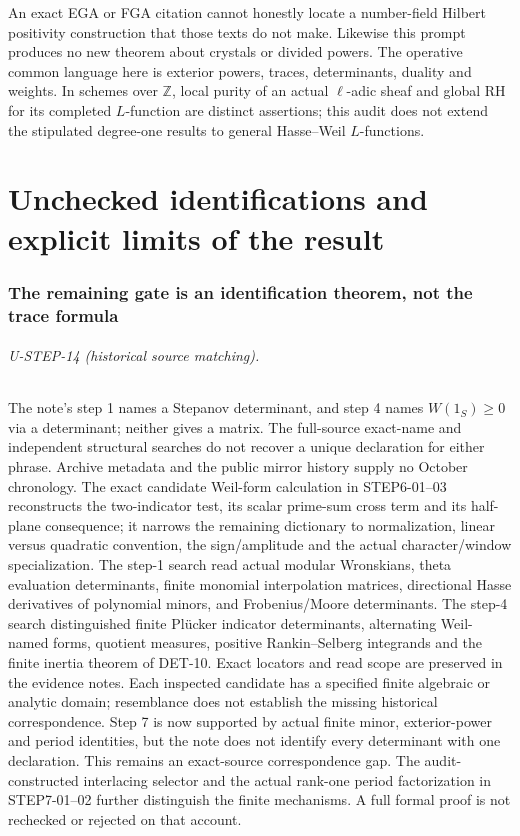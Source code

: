 \documentclass[11pt,a4paper]{article}
\newcommand{\Z}{\mathbb Z}
\newcommand{\fid}[1]{\textsf{#1}}
\begin{document}
An exact EGA or FGA citation cannot honestly locate a number-field Hilbert positivity construction that those texts do not make. Likewise this prompt produces no new theorem about crystals or divided powers. The operative common language here is exterior powers, traces, determinants, duality and weights. In schemes over $\Z$, local purity of an actual $\ell$-adic sheaf and global RH for its completed $L$-function are distinct assertions; this audit does not extend the stipulated degree-one results to general Hasse--Weil $L$-functions.

\part{Unchecked identifications and explicit limits of the result}
\section{The remaining gate is an identification theorem, not the trace formula}
\paragraph{U-STEP-14 (historical source matching).}
The note's step 1 names a Stepanov determinant, and step 4 names $W(1_S)\ge0$ via a determinant; neither gives a matrix. The full-source exact-name and independent structural searches do not recover a unique declaration for either phrase. Archive metadata and the public mirror history supply no October chronology. The exact candidate Weil-form calculation in \fid{STEP6-01--03} reconstructs the two-indicator test, its scalar prime-sum cross term and its half-plane consequence; it narrows the remaining dictionary to normalization, linear versus quadratic convention, the sign/amplitude and the actual character/window specialization. The step-1 search read actual modular Wronskians, theta evaluation determinants, finite monomial interpolation matrices, directional Hasse derivatives of polynomial minors, and Frobenius/Moore determinants. The step-4 search distinguished finite Pl\"ucker indicator determinants, alternating Weil-named forms, quotient measures, positive Rankin--Selberg integrands and the finite inertia theorem of \fid{DET-10}. Exact locators and read scope are preserved in the evidence notes. Each inspected candidate has a specified finite algebraic or analytic domain; resemblance does not establish the missing historical correspondence. Step 7 is now supported by actual finite minor, exterior-power and period identities, but the note does not identify every determinant with one declaration. This remains an exact-source correspondence gap. The audit-constructed interlacing selector and the actual rank-one period factorization in \fid{STEP7-01--02} further distinguish the finite mechanisms. A full formal proof is not rechecked or rejected on that account.
\end{document}
